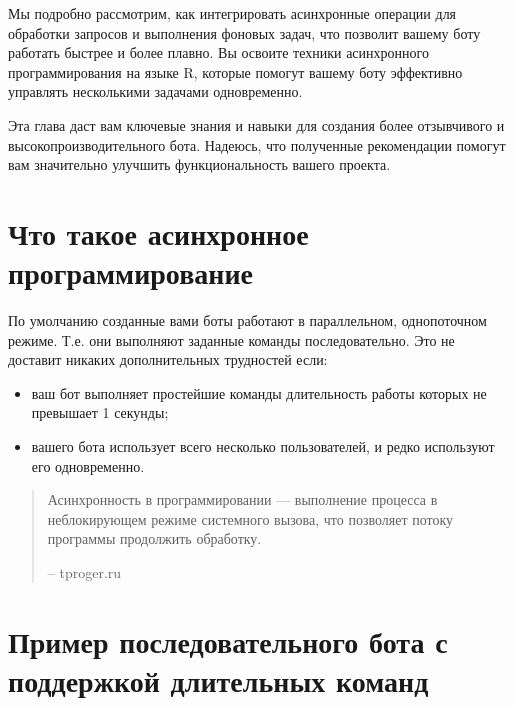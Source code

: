\documentclass[
]{book}
\providecommand{\tightlist}{%
  \setlength{\itemsep}{0pt}\setlength{\parskip}{0pt}}
\begin{document}
Мы подробно рассмотрим, как интегрировать асинхронные операции для обработки запросов и выполнения фоновых задач, что позволит вашему боту работать быстрее и более плавно. Вы освоите техники асинхронного программирования на языке R, которые помогут вашему боту эффективно управлять несколькими задачами одновременно.

Эта глава даст вам ключевые знания и навыки для создания более отзывчивого и высокопроизводительного бота. Надеюсь, что полученные рекомендации помогут вам значительно улучшить функциональность вашего проекта.

\section{Что такое асинхронное программирование}\label{ux447ux442ux43e-ux442ux430ux43aux43eux435-ux430ux441ux438ux43dux445ux440ux43eux43dux43dux43eux435-ux43fux440ux43eux433ux440ux430ux43cux43cux438ux440ux43eux432ux430ux43dux438ux435}

По умолчанию созданные вами боты работают в параллельном, однопоточном режиме. Т.е. они выполняют заданные команды последовательно. Это не доставит никаких дополнительных трудностей если:

\begin{itemize}
\tightlist
\item
  ваш бот выполняет простейшие команды длительность работы которых не превышает 1 секунды;
\item
  вашего бота использует всего несколько пользователей, и редко используют его одновременно.
\end{itemize}

\begin{quote}
Асинхронность в программировании --- выполнение процесса в неблокирующем режиме системного вызова, что позволяет потоку программы продолжить обработку.

-- tproger.ru
\end{quote}

\section{Пример последовательного бота с поддержкой длительных команд}\label{ux43fux440ux438ux43cux435ux440-ux43fux43eux441ux43bux435ux434ux43eux432ux430ux442ux435ux43bux44cux43dux43eux433ux43e-ux431ux43eux442ux430-ux441-ux43fux43eux434ux434ux435ux440ux436ux43aux43eux439-ux434ux43bux438ux442ux435ux43bux44cux43dux44bux445-ux43aux43eux43cux430ux43dux434}
\end{document}
